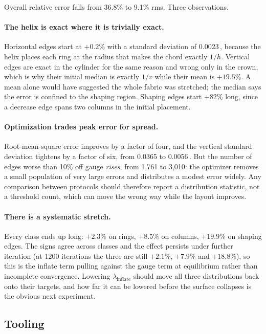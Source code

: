 \documentclass[11pt]{article}
\begin{document}
Overall relative error falls from 36.8\% to 9.1\% rms. Three observations.

\paragraph{The helix is exact where it is trivially exact.}
Horizontal edges start at $+0.2\%$ with a standard deviation of
0.0023\,, because the helix places each ring at the radius that makes
the chord exactly $1/h$. Vertical edges are exact in the cylinder for the same
reason and wrong only in the crown, which is why their initial median is
exactly $1/v$ while their mean is $+19.5\%$. A mean alone would have suggested
the whole fabric was stretched; the median says the error is confined to the
shaping region. Shaping edges start $+82\%$ long, since a decrease edge spans
two columns in the initial placement.

\paragraph{Optimization trades peak error for spread.}
Root-mean-square error improves by a factor of four, and the vertical standard
deviation tightens by a factor of six, from 0.0365 to
0.0056\,. But the number of edges worse than 10\% off gauge
\emph{rises}, from 1{,}761 to 3{,}010: the optimizer removes a small
population of very large errors and distributes a modest error widely. Any
comparison between protocols should therefore report a distribution statistic,
not a threshold count, which can move the wrong way while the layout improves.

\paragraph{There is a systematic stretch.}
Every class ends up long: $+2.3\%$ on rings, $+8.5\%$ on columns, $+19.9\%$ on
shaping edges. The signs agree across classes and the effect persists under
further iteration (at 1200 iterations the three are still $+2.1\%$, $+7.9\%$
and $+18.8\%$), so this is the inflate term pulling against the gauge term at
equilibrium rather than incomplete convergence. Lowering
$\lambda_{\text{inflate}}$ should move all three distributions back onto their
targets, and how far it can be lowered before the surface collapses is the
obvious next experiment.

\subsection{Tooling}
\end{document}
